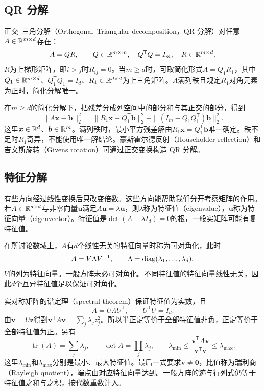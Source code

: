 \subsection{QR 分解}
正交--三角分解（Orthogonal--Triangular decomposition，QR 分解）对任意$A\in\mathbb{R}^{m\times d}$存在：
\begin{equation}
 A=QR,\qquad Q\in\mathbb{R}^{m\times m},\quad Q^{\mathsf T}Q=I_m,\quad R\in\mathbb{R}^{m\times d}.
\end{equation}
$R$为上梯形矩阵，即$i>j$时$R_{ij}=0$。当$m\geq d$时，可取简化形式$A=Q_1R_1$，其中$Q_1\in\mathbb{R}^{m\times d}$、$Q_1^{\mathsf T}Q_1=I_d$、$R_1\in\mathbb{R}^{d\times d}$为上三角矩阵。$A$满列秩且规定$R_1$对角元素为正时，简化分解唯一。

在$m\geq d$的简化分解下，把残差分成列空间中的部分和与其正交的部分，得到
\begin{equation}
 \|A\bm x-\bm b\|_2^2=\|R_1\bm x-Q_1^{\mathsf T}\bm b\|_2^2
 +\|(I_m-Q_1Q_1^{\mathsf T})\bm b\|_2^2.
\end{equation}
这里$\bm x\in\mathbb{R}^d$、$\bm b\in\mathbb{R}^m$。满列秩时，最小平方残差解由$R_1\bm x=Q_1^{\mathsf T}\bm b$唯一确定。秩不足时$R_1$奇异，不能使用唯一解结论。豪斯霍尔德反射（Householder reflection）和吉文斯旋转（Givens rotation）可通过正交变换构造 QR 分解。

\subsection{特征分解}
有些方向经过线性变换后只改变倍数。这些方向能帮助我们分开考察矩阵的作用。若$A\in\mathbb{R}^{d\times d}$与非零向量$\bm u$满足$A\bm u=\lambda\bm u$，则$\lambda$称为特征值（eigenvalue），$\bm u$称为特征向量（eigenvector）。特征值是$\det(A-\lambda I_d)=0$的根，一般实矩阵可能有复特征值。

在所讨论数域上，$A$有$d$个线性无关的特征向量时称为可对角化，此时
\begin{equation}
 A=V\Lambda V^{-1},\qquad\Lambda=\operatorname{diag}(\lambda_1,\ldots,\lambda_d).
\end{equation}
$V$的列为特征向量。一般方阵未必可对角化。不同特征值的特征向量线性无关，因此$d$个互异特征值足以保证可对角化。

实对称矩阵的谱定理（spectral theorem）保证特征值为实数，且
\begin{equation}
 A=U\Lambda U^{\mathsf T},\qquad U^{\mathsf T}U=I_d.
\end{equation}
由$\bm v=U\bm z$得到$\bm v^{\mathsf T}A\bm v=\sum_j\lambda_jz_j^2$。所以半正定等价于全部特征值非负，正定等价于全部特征值为正。另有
\begin{equation}
 \operatorname{tr}(A)=\sum_j\lambda_j,\qquad\det A=\prod_j\lambda_j,\qquad
 \lambda_{\min}\leq\frac{\bm v^{\mathsf T}A\bm v}{\bm v^{\mathsf T}\bm v}\leq\lambda_{\max}.
\end{equation}
这里$\lambda_{\min}$和$\lambda_{\max}$分别是最小、最大特征值。最后一式要求$\bm v\ne\bm0$，比值称为瑞利商（Rayleigh quotient），端点由对应特征向量达到。一般方阵的迹与行列式仍等于特征值之和与之积，按代数重数计入。

